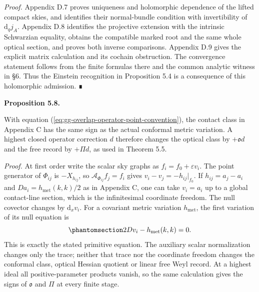 \documentclass[
  english,
  11pt,
  reqno]{amsart}
\makeatletter
\newcommand{\pandocstatementheading}[1]{%
  \par\addpenalty{\@beginparpenalty}%
  \addvspace{.5\baselineskip plus .2\baselineskip minus .2\baselineskip}%
  {\normalfont\bfseries #1\par}%
  \nobreak\@afterindenttrue\@afterheading
}
\makeatother
\begin{document}
\emph{Proof.} Appendix D.7 proves uniqueness and holomorphic dependence
of the lifted compact skies, and identifies their normal-bundle
condition with invertibility of \(\mathrm d_qj_A\). Appendix D.8
identifies the projective extension with the intrinsic Schwarzian
equality, obtains the compatible marked root and the same whole optical
section, and proves both inverse comparisons. Appendix D.9 gives the
explicit matrix calculation and its cochain obstruction. The convergence
statement follows from the finite formulas there and the common analytic
witness in §6. Thus the Einstein recognition in Proposition 5.4 is a
consequence of this holomorphic admission. ∎

\pandocstatementheading{\protect{}\label{prop:gg-overlap-orientation}Proposition 5.8.}

With equation (\ref{eq:gg-overlap-operator-point-convention}), the
contact class in Appendix C has the same sign as the actual conformal
metric variation. A highest closed operator correction \(d\) therefore
changes the optical class by \(+\mathfrak o d\) and the free record by
\(+\Pi d\), as used in Theorem 5.5.

\emph{Proof.} At first order write the scalar sky graphs as
\(f_i=f_0+\varepsilon v_i\). The point generator of \(\Phi_{ij}\) is
\(-X_{h_{ij}}\), so \(\mathscr A_{\Phi_{ij}}f_j=f_i\) gives
\(v_i-v_j=-h_{ij}|_{f_0}\). If \(h_{ij}=a_j-a_i\) and
\(Da_i=h_{\mathrm{met}}(k,k)/2\) as in Appendix C, one can take
\(v_i=a_i\) up to a global contact-line section, which is the
infinitesimal coordinate freedom. The null covector changes by
\(\mathrm d_xv_i\). For a covariant metric variation
\(h_{\mathrm{met}}\), the first variation of its null equation is
\begin{equation}\protect\phantomsection\label{eq:gg-overlap-metric-sign-check}{
 2D v_i-h_{\mathrm{met}}(k,k)=0 .
}\end{equation} This is exactly the stated primitive equation. The
auxiliary scalar normalization changes only the trace; neither that
trace nor the coordinate freedom changes the conformal class, optical
Hessian quotient or linear free Weyl record. At a highest ideal all
positive-parameter products vanish, so the same calculation gives the
signs of \(\mathfrak o\) and \(\Pi\) at every finite stage.
\end{document}
